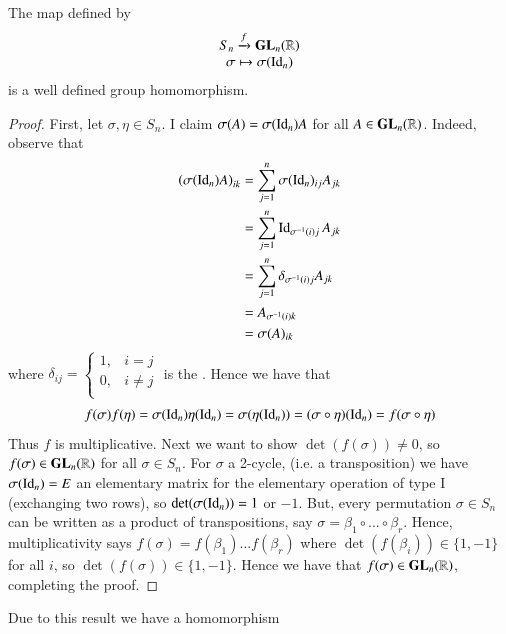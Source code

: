 \documentclass[12pt, a4paper, oneside, openright, titlepage]{book}
\begin{document}
\begin{claim}
        The map defined by \begin{equation}
                \begin{array}{c} S_n\xrightarrow{f}\mathbf{GL}_n(\mathbb R) \\ \sigma \mapsto \sigma(\operatorname{Id}_n) \end{array}
        \end{equation}
        is a well defined group homomorphism.
\end{claim}
\begin{proof}
        First, let $\sigma, \eta \in S_n$. I claim $\sigma(A) = \sigma(\operatorname{Id}_n)A$ for all $A \in \mathbf{GL}_n(\mathbb R)$. Indeed, observe that \begin{align*}
                \left(\sigma(\operatorname{Id}_n)A\right)_{ik} &= \sum\limits_{j=1}^n\sigma(\operatorname{Id}_n)_{ij}A_{jk} \\
                &= \sum\limits_{j=1}^n\operatorname{Id}_{\sigma^{-1}(i)j}A_{jk} \\
                &= \sum\limits_{j=1}^n\delta_{\sigma^{-1}(i)j}A_{jk} \\
                &= A_{\sigma^{-1}(i)k} \\
                &= \sigma(A)_{ik}
        \end{align*}
        where $\delta_{ij} = \left\{\begin{array}{ll} 1, & i = j \\ 0, & i \neq j \\ \end{array}\right.$ is the . Hence we have that \begin{equation}
                f(\sigma)f(\eta) = \sigma(\operatorname{Id}_n)\eta(\operatorname{Id}_n) = \sigma(\eta(\operatorname{Id}_n)) = (\sigma \circ \eta)(\operatorname{Id}_n) = f(\sigma \circ \eta)
        \end{equation}
        Thus $f$ is multiplicative. Next we want to show $\det(f(\sigma)) \neq 0$, so $f(\sigma) \in \mathbf{GL}_n(\mathbb R)$ for all $\sigma \in S_n$. For $\sigma$ a 2-cycle, (i.e. a transposition) we have $\sigma(\operatorname{Id}_n) = E$ an elementary matrix for the elementary operation of type I (exchanging two rows), so $\det(\sigma(\operatorname{Id}_n)) = 1$ or $-1$. But, every permutation $\sigma \in S_n$ can be written as a product of transpositions, say $\sigma = \beta_1 \circ ...\circ \beta_r$. Hence, multiplicativity says $f(\sigma) = f(\beta_1)...f(\beta_r)$ where $\det(f(\beta_i)) \in \{1,-1\}$ for all $i$, so $\det(f(\sigma)) \in \{1,-1\}$. Hence we have that $f(\sigma) \in \mathbf{GL}_n(\mathbb R)$, completing the proof.
\end{proof}


\begin{cor}
        Due to this result we have a homomorphism
        \begin{center}
        \end{center}
\end{cor}
\end{document}
